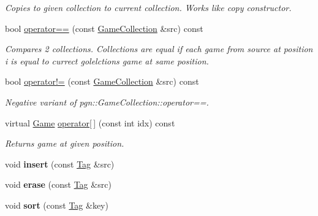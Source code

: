 \begin{DoxyCompactItemize}
\begin{DoxyCompactList}\small\item\em Copies to given collection to current collection. Works like copy constructor. \item\end{DoxyCompactList}\item 
bool \hyperlink{classpgn_1_1GameCollection_ac44836abf6657d7dd6197f0dfd588f13}{operator==} (const \hyperlink{classpgn_1_1GameCollection}{GameCollection} \&src) const 
\begin{DoxyCompactList}\small\item\em Compares 2 collections. Collections are equal if each game from source at position {\itshape i\/} is equal to currect golelctions game at same position. \item\end{DoxyCompactList}\item 
bool \hyperlink{classpgn_1_1GameCollection_a0e1e33d95047e969cfc9eef2aec648ad}{operator!=} (const \hyperlink{classpgn_1_1GameCollection}{GameCollection} \&src) const 
\begin{DoxyCompactList}\small\item\em Negative variant of pgn::GameCollection::operator==. \item\end{DoxyCompactList}\item 
virtual \hyperlink{classpgn_1_1Game}{Game} \hyperlink{classpgn_1_1GameCollection_a378ad3a7d49fc600d9ba7693e58f4787}{operator\mbox{[}$\,$\mbox{]}} (const int idx) const 
\begin{DoxyCompactList}\small\item\em Returns game at given position. \item\end{DoxyCompactList}\item 
\hypertarget{classpgn_1_1GameCollection_a064236d0087a8cb284991904185abdb0}{
void {\bfseries insert} (const \hyperlink{classpgn_1_1Tag}{Tag} \&src)}
\label{classpgn_1_1GameCollection_a064236d0087a8cb284991904185abdb0}

\item 
\hypertarget{classpgn_1_1GameCollection_a1186e0c841693731f0d327dab4592c40}{
void {\bfseries erase} (const \hyperlink{classpgn_1_1Tag}{Tag} \&src)}
\label{classpgn_1_1GameCollection_a1186e0c841693731f0d327dab4592c40}

\item 
\hypertarget{classpgn_1_1GameCollection_a1499892a12a4fe8a6eec302317cd3717}{
void {\bfseries sort} (const \hyperlink{classpgn_1_1Tag}{Tag} \&key)}
\label{classpgn_1_1GameCollection_a1499892a12a4fe8a6eec302317cd3717}


\end{DoxyCompactItemize}
